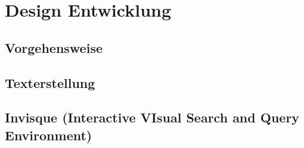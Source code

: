 \section{Design Entwicklung}

		
	\subsection{Vorgehensweise}
		

	\subsection{Texterstellung}
		

	\subsection{Invisque (Interactive VIsual Search and Query Environment)}
		
